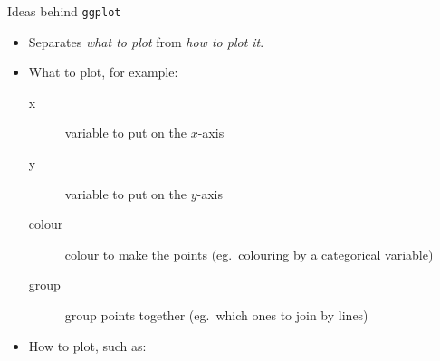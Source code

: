 \begin{frame}[fragile]{Ideas behind \texttt{ggplot}}
  
  \begin{itemize}
  \item Separates \emph{what to plot} from \emph{how to plot it}.
  \item What to plot, for example:
    \begin{description}
    \item[x] variable to put on the $x$-axis
    \item[y] variable to put on the $y$-axis
    \item[colour] colour to make the points (eg.\ colouring by a
      categorical variable)
    \item[group] group points together (eg.\ which ones to join  by lines)
    \end{description}
  \item How to plot, such as:
  \end{itemize}
  
\end{frame}

